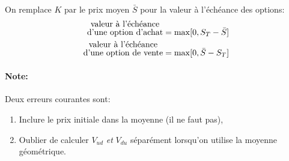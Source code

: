 \documentclass[10pt, french]{article}
\begin{document}
\begin{multicols*}{2}
\begin{definitionNOHFILLsub}
On remplace $K$ par le prix moyen $\bar{S}$ pour la valeur à l'échéance des options:\\
\begin{align*}
	\shortstack{valeur à l'échéance\\ d'une option d'achat}
	&=	\max[0, S_{T}	-	\bar{S}]	\\
	\shortstack{valeur à l'échéance\\ d'une option de vente}
	&=	\max[0, 	\bar{S}	-	S_{T}]
\end{align*}
\end{definitionNOHFILLsub}

\paragraph{Note:}	Deux erreurs courantes sont:  
\begin{enumerate}
	\item	Inclure le prix initiale dans la moyenne (il ne faut pas),
	\item	Oublier de calculer $V_{ud}$ \textit{et} $V_{du}$ séparément lorsqu'on utilise la moyenne géométrique.
\end{enumerate}


\end{multicols*}
\end{document}
